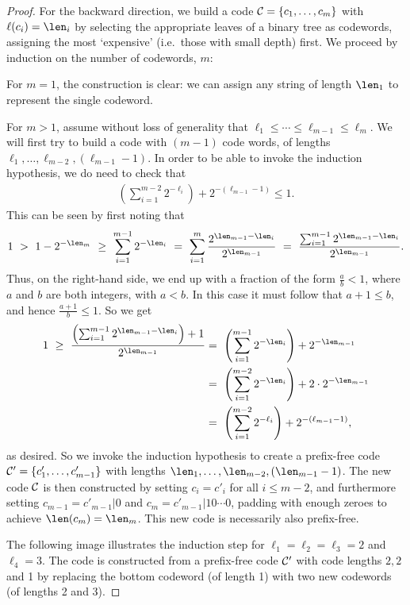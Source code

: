\begin{proof}
For the backward direction, we build a code ${\cal C} = \{c_1, \ldots, c_m\}$ with $\ell(c_i) = \len_i$ by selecting the appropriate leaves of a binary tree as codewords, assigning the most `expensive' (i.e.\ those with small depth) first. We proceed by induction on the number of codewords, $m$:

For $m = 1$, the construction is clear: we can assign any string of length $\len_1$ to represent the single codeword.

For $m > 1$, assume without loss of generality that $\ell_1 \leq \cdots \leq \ell_{m-1} \leq \ell_{m}$. We will first try to build a code with $(m-1)$ code words, of lengths $\ell_1, \ldots, \ell_{m-2}, (\ell_{m-1} - 1)$. In order to be able to invoke the induction hypothesis, we do need to check that
\begin{align}
\left(\sum_{i=1}^{m-2} 2^{-\ell_{i}}\right) + 2^{-(\ell_{m-1} - 1)} \leq 1.
\end{align}
This can be seen by first noting that
\begin{align}
1 \ > \ 1 - 2^{-\len_m} \ \geq \ \sum_{i=1}^{m-1} 2^{-\len_i} \ = \ \sum_{i=1}^m \frac{2^{\len_{m-1} - \len_i}}{2^{\len_{m-1}}} \ = \ \frac{\sum_{i=1}^{m-1} 2^{\len_{m-1} - \len_i}}{2^{\len_{m-1}}}.
\end{align}
Thus, on the right-hand side, we end up with a fraction of the form $\frac{a}{b} < 1$, where $a$ and $b$ are both integers, with $a < b$. In this case it must follow that $a + 1 \leq b$, and hence $\frac{a+1}{b} \leq 1$. So we get
\begin{align}
1
\ \geq \ \frac{\left(\sum_{i=1}^{m-1} 2^{\len_{m-1} - \len_i}\right) + 1}{2^{\len_{m-1}}}
&= \ \left(\sum_{i=1}^{m-1} 2^{-\len_i}\right) + 2^{-\len_{m-1}}\nonumber\\
&= \ \left(\sum_{i=1}^{m-2} 2^{-\len_i}\right) + 2\cdot 2^{-\len_{m-1}}\nonumber\\
&= \ \left(\sum_{i=1}^{m-2} 2^{-\ell_{i}}\right) + 2^{-(\ell_{m-1} - 1)},
\end{align}
as desired. So we invoke the induction hypothesis to create a prefix-free code ${\cal C}' = \{c'_1, \ldots, c'_{m-1}\}$ with lengths $\len_1, \ldots, \len_{m-2}, (\len_{m-1} - 1)$. The new code ${\cal C}$ is then constructed by setting $c_i = c'_i$ for all $i \leq m-2$, and furthermore setting $c_{m-1} = c'_{m-1}|0$ and $c_m = c'_{m-1}|10\cdots 0$, padding with enough zeroes to achieve $\len(c_m) = \len_m$. This new code is necessarily also prefix-free.

The following image illustrates the induction step for $\ell_1 = \ell_2 = \ell_3 = 2$ and $\ell_4 = 3$. The code is constructed from a prefix-free code ${\cal C}'$ with code lengths $2, 2$ and 1 by replacing the bottom codeword (of length 1) with two new codewords (of lengths 2 and 3).


\end{proof}

